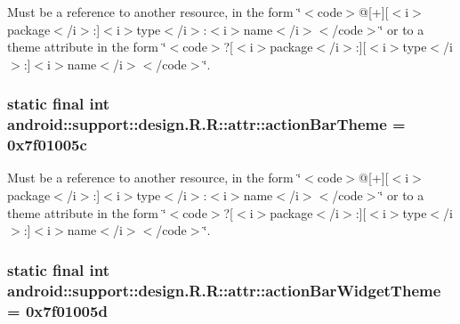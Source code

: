 Must be a reference to another resource, in the form \char`\"{}$<$code$>$@\mbox{[}+\mbox{]}\mbox{[}$<$i$>$package$<$/i$>$:\mbox{]}$<$i$>$type$<$/i$>$:$<$i$>$name$<$/i$>$$<$/code$>$\char`\"{} or to a theme attribute in the form \char`\"{}$<$code$>$?\mbox{[}$<$i$>$package$<$/i$>$:\mbox{]}\mbox{[}$<$i$>$type$<$/i$>$:\mbox{]}$<$i$>$name$<$/i$>$$<$/code$>$\char`\"{}. \hypertarget{classandroid_1_1support_1_1design_1_1_r_1_1attr_74d6cfb7e59a58fc583d75d47e4849f6}{
\subsubsection[{actionBarTheme}]{\setlength{\rightskip}{0pt plus 5cm}static final int android::support::design.R.R::attr::actionBarTheme = 0x7f01005c}}
\label{classandroid_1_1support_1_1design_1_1_r_1_1attr_74d6cfb7e59a58fc583d75d47e4849f6}


Must be a reference to another resource, in the form \char`\"{}$<$code$>$@\mbox{[}+\mbox{]}\mbox{[}$<$i$>$package$<$/i$>$:\mbox{]}$<$i$>$type$<$/i$>$:$<$i$>$name$<$/i$>$$<$/code$>$\char`\"{} or to a theme attribute in the form \char`\"{}$<$code$>$?\mbox{[}$<$i$>$package$<$/i$>$:\mbox{]}\mbox{[}$<$i$>$type$<$/i$>$:\mbox{]}$<$i$>$name$<$/i$>$$<$/code$>$\char`\"{}. \hypertarget{classandroid_1_1support_1_1design_1_1_r_1_1attr_2dea685f65aa19237636907f049c7402}{
\subsubsection[{actionBarWidgetTheme}]{\setlength{\rightskip}{0pt plus 5cm}static final int android::support::design.R.R::attr::actionBarWidgetTheme = 0x7f01005d}}
\label{classandroid_1_1support_1_1design_1_1_r_1_1attr_2dea685f65aa19237636907f049c7402}


